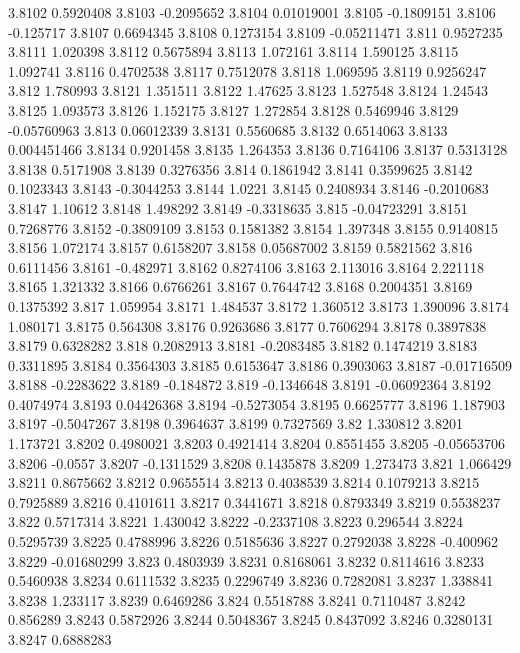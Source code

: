 3.8102  0.5920408
3.8103  -0.2095652
3.8104  0.01019001
3.8105  -0.1809151
3.8106  -0.125717
3.8107  0.6694345
3.8108  0.1273154
3.8109  -0.05211471
3.811  0.9527235
3.8111  1.020398
3.8112  0.5675894
3.8113  1.072161
3.8114  1.590125
3.8115  1.092741
3.8116  0.4702538
3.8117  0.7512078
3.8118  1.069595
3.8119  0.9256247
3.812  1.780993
3.8121  1.351511
3.8122  1.47625
3.8123  1.527548
3.8124  1.24543
3.8125  1.093573
3.8126  1.152175
3.8127  1.272854
3.8128  0.5469946
3.8129  -0.05760963
3.813  0.06012339
3.8131  0.5560685
3.8132  0.6514063
3.8133  0.004451466
3.8134  0.9201458
3.8135  1.264353
3.8136  0.7164106
3.8137  0.5313128
3.8138  0.5171908
3.8139  0.3276356
3.814  0.1861942
3.8141  0.3599625
3.8142  0.1023343
3.8143  -0.3044253
3.8144  1.0221
3.8145  0.2408934
3.8146  -0.2010683
3.8147  1.10612
3.8148  1.498292
3.8149  -0.3318635
3.815  -0.04723291
3.8151  0.7268776
3.8152  -0.3809109
3.8153  0.1581382
3.8154  1.397348
3.8155  0.9140815
3.8156  1.072174
3.8157  0.6158207
3.8158  0.05687002
3.8159  0.5821562
3.816  0.6111456
3.8161  -0.482971
3.8162  0.8274106
3.8163  2.113016
3.8164  2.221118
3.8165  1.321332
3.8166  0.6766261
3.8167  0.7644742
3.8168  0.2004351
3.8169  0.1375392
3.817  1.059954
3.8171  1.484537
3.8172  1.360512
3.8173  1.390096
3.8174  1.080171
3.8175  0.564308
3.8176  0.9263686
3.8177  0.7606294
3.8178  0.3897838
3.8179  0.6328282
3.818  0.2082913
3.8181  -0.2083485
3.8182  0.1474219
3.8183  0.3311895
3.8184  0.3564303
3.8185  0.6153647
3.8186  0.3903063
3.8187  -0.01716509
3.8188  -0.2283622
3.8189  -0.184872
3.819  -0.1346648
3.8191  -0.06092364
3.8192  0.4074974
3.8193  0.04426368
3.8194  -0.5273054
3.8195  0.6625777
3.8196  1.187903
3.8197  -0.5047267
3.8198  0.3964637
3.8199  0.7327569
3.82  1.330812
3.8201  1.173721
3.8202  0.4980021
3.8203  0.4921414
3.8204  0.8551455
3.8205  -0.05653706
3.8206  -0.0557
3.8207  -0.1311529
3.8208  0.1435878
3.8209  1.273473
3.821  1.066429
3.8211  0.8675662
3.8212  0.9655514
3.8213  0.4038539
3.8214  0.1079213
3.8215  0.7925889
3.8216  0.4101611
3.8217  0.3441671
3.8218  0.8793349
3.8219  0.5538237
3.822  0.5717314
3.8221  1.430042
3.8222  -0.2337108
3.8223  0.296544
3.8224  0.5295739
3.8225  0.4788996
3.8226  0.5185636
3.8227  0.2792038
3.8228  -0.400962
3.8229  -0.01680299
3.823  0.4803939
3.8231  0.8168061
3.8232  0.8114616
3.8233  0.5460938
3.8234  0.6111532
3.8235  0.2296749
3.8236  0.7282081
3.8237  1.338841
3.8238  1.233117
3.8239  0.6469286
3.824  0.5518788
3.8241  0.7110487
3.8242  0.856289
3.8243  0.5872926
3.8244  0.5048367
3.8245  0.8437092
3.8246  0.3280131
3.8247  0.6888283
